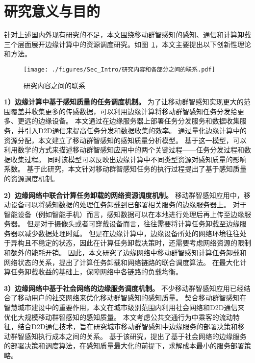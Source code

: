 
\section{研究意义与目的}

针对上述国内外现有研究的不足，本文围绕移动群智感知的感知、通信和计算卸载三个层面展开边缘计算中的资源调度研究。如图~\ref{Figure_Re_Part}，本文主要提出以下创新性理论和方法。

\begin{figure}[!h]
  \centering
  \vspace{-1em}
  \texttt{[image: ./figures/Sec\_Intro/研究内容和各部分之间的联系.pdf]}
  \caption{研究内容之间的联系}
  \label{Figure_Re_Part}
\end{figure}

\textbf{1）边缘计算中基于感知质量的任务调度机制。}
为了让移动群智感知实现更大的范围覆盖并收集更多的传感数据，可以利用边缘计算将移动群智感知任务分发给更多、更远的边缘设备。
本文通过在边缘服务器上部署任务分发服务和数据收集服务，并引入D2D通信来提高任务分发和数据收集的效率。
通过量化边缘计算中的资源分配，本文建立了移动群智感知的感知质量分析模型。
基于这一模型，可以利用数学的方式来描述移动群智感知应用中的两个关键过程——任务分发过程和数据收集过程。
同时该模型可以反映出边缘计算中不同类型资源对感知质量的影响系数。
基于此研究，本文针对移动群智感知任务的执行过程提出了基于感知质量的资源调度机制。

\textbf{2）边缘网络中联合计算任务卸载的网络资源调度机制。}
移动群智感知应用中，移动设备可以将感知数据的处理任务卸载到已部署相关服务的边缘服务器上。
对于智能设备（例如智能手机）而言，感知数据可以在本地进行处理后再上传至边缘服务器。
但是对于摄像头或者可穿戴设备而言，往往需要将计算任务卸载至边缘服务器以减少数据处理时延。
但是在边缘计算中，边缘设备所处的网络环境往往处于异构且不稳定的状态，因此在计算任务卸载决策时，还需要考虑网络资源的限制和额外的能耗开销。
因此，本文研究了边缘网络中移动群智感知计算任务卸载和网络状态的关系，提出了计算任务卸载和网络链路的联合调度算法。
在最大化计算任务卸载收益的基础上，保障网络中各链路的负载均衡。

\textbf{3）边缘网络中基于社会网络的边缘服务调度机制。}
不少移动群智感知应用已经结合了移动用户的社交网络来优化移动群智感知的感知质量。
契合移动群智感知在智慧城市建设中的重要作用，本文在城市级别范围内利用社会网络和D2D通信来优化大规模移动群智感知的感知质量。
本文考虑公共交通行为中乘客的流动特征，结合D2D通信技术，旨在研究城市移动群智感知中边缘服务的部署决策和移动群智感知执行成本之间的关系。
基于该研究，提出了基于社会网络的边缘服务的部署决策和调度算法，在感知质量最大化的前提下，求解成本最小的服务部署策略。

